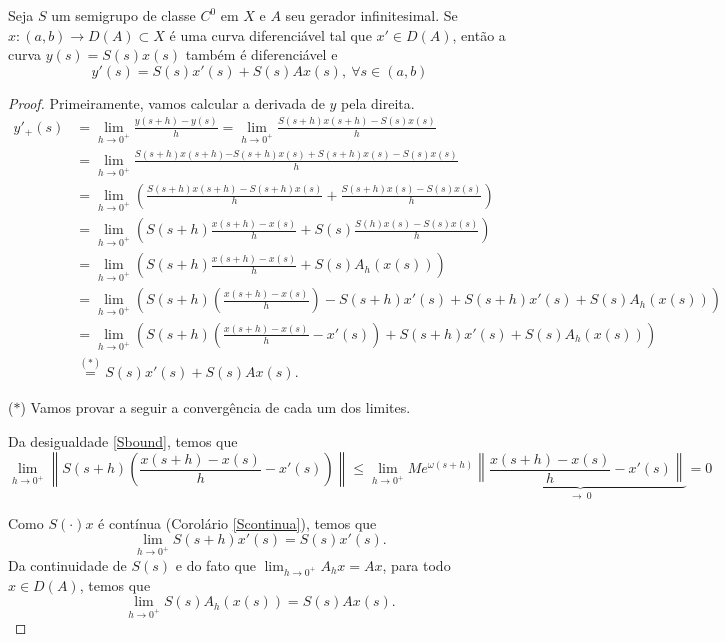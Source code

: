\begin{proposition}
Seja $S$ um semigrupo de classe $C^0$ em $X$ e $A$ seu gerador infinitesimal. Se  $x:(a,b)\to D(A)\subset X$ é uma curva diferenciável tal que  $x'\in D(A)$, então a curva $y(s)=S(s)x(s)$ também é diferenciável e
\begin{equation}\label{reg.cad}
y'(s)=S(s)x'(s)+S(s)Ax(s),\ \forall s\in (a,b)
\end{equation}
\end{proposition}
\begin{proof}
Primeiramente, vamos calcular a derivada de $y$ pela direita.
\begin{align*}
y'_+(s)& = \lim\limits_{h\to 0^+}\frac{y(s+h)-y(s)}{h}
=\lim\limits_{h\to 0^+}\frac{S(s+h)x(s+h)-S(s)x(s)}{h}\\
& =\lim\limits_{h\to 0^+}\frac{S(s+h)x(s+h){-S(s+h)x(s)+S(s+h)x(s)}-S(s)x(s)}{h}\\
& =\lim\limits_{h\to 0^+}\left(\frac{S(s+h)x(s+h)-S(s+h)x(s)}{h}+\frac{S(s+h)x(s)-S(s)x(s)}{h}\right)
\\
& =\lim\limits_{h\to 0^+}\left(S(s+h)\frac{x(s+h)-x(s)}{h}+S(s)\frac{S(h)x(s)-S(s)x(s)}{h}\right)\\
& =\lim\limits_{h\to 0^+}\left(S(s+h)\frac{x(s+h)-x(s)}{h}+S(s)A_h(x(s))\right)\\
& =\lim\limits_{h\to 0^+}\left(S(s+h)\left(\frac{x(s+h)-x(s)}{h} \right) -S(s+h)x'(s)+S(s+h)x'(s)
+S(s)A_h(x(s)) \right)\\
& =\lim\limits_{h\to 0^+}\left(S(s+h)\left(\frac{x(s+h)-x(s)}{h}-x'(s)\right)+S(s+h)x'(s)
+S(s)A_h(x(s))\right)\\
&\stackrel{(\ast)}{=}S(s)x'(s)+S(s)Ax(s).
\end{align*}

\noindent($\ast$) Vamos provar a seguir a convergência de cada um dos limites.

Da desigualdade \eqref{Sbound}, temos que 
\begin{equation*}
\lim\limits_{h\to 0^+}\left\|S(s+h)\left(\frac{x(s+h)-x(s)}{h}-x'(s)\right)\right\|
\leq \lim\limits_{h\to 0^+}
Me^{\omega(s+h)}\underbrace{\left\|\frac{x(s+h)-x(s)}{h}-x'(s)\right\|}_{\to\  0}
=0
\end{equation*}

Como $S(\cdot)x$ é contínua (Corolário \ref{Scontinua}), temos que
\[
\lim\limits_{h\to 0^+}S(s+h)x'(s)=S(s)x'(s).
\]
Da continuidade de $S(s)$ e do fato que $\lim_{h \to 0^+}A_hx=Ax$, para todo $x\in D(A)$, temos que 
\[
\lim\limits_{h\to 0^+}S(s)A_h(x(s))=S(s)Ax(s).
\]


\end{proof}
